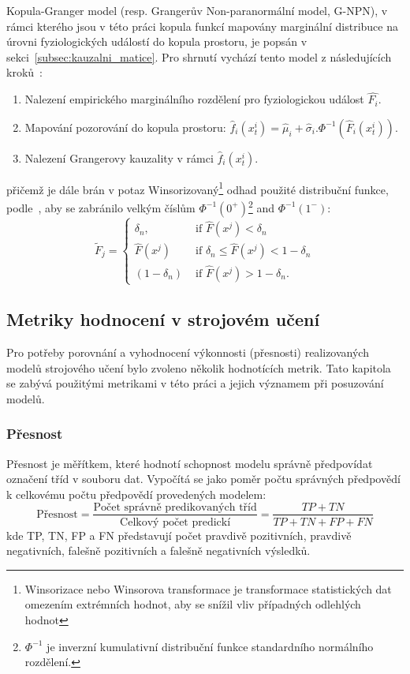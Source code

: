Kopula-Granger model (resp. Grangerův Non-paranormální model, G-NPN), v rámci
kterého jsou v této práci kopula funkcí mapovány marginální distribuce na úrovni
fyziologických událostí do kopula prostoru, je popsán v
sekci~\ref{subsec:kauzalni_matice}. Pro shrnutí vychází tento model z
následujících kroků~\cite{Guy2016}:
\begin{enumerate}
    \item Nalezení empirického marginálního rozdělení pro fyziologickou událost
          $\hat{F_i}$.
    \item Mapování pozorování do kopula prostoru:
          $\hat{f}_i\left(x_t^i\right)=\hat{\mu}_i+\hat{\sigma}_i.
              \Phi^{-1}\left(\hat{F}_i\left(x_t^i\right)\right)$.
    \item Nalezení Grangerovy kauzality v rámci $\hat{f}_i\left(x_t^i\right)$.
\end{enumerate}
přičemž je dále brán v potaz Winsorizovaný\footnote{Winsorizace nebo Winsorova
transformace je transformace statistických dat omezením extrémních hodnot,
aby se snížil vliv případných odlehlých hodnot} odhad použité distribuční
funkce, podle~\cite{Bahadori2013}, aby se zabránilo velkým číslům
$\Phi^{-1}\left(0^{+}\right)$\footnote{$\Phi^{-1}$ je inverzní kumulativní
distribuční funkce standardního normálního rozdělení.} and
$\Phi^{-1}\left(1^{-}\right)$:
\begin{equation}
    \tilde{F}_j= \begin{cases}\delta_n, & \text { if } \hat{F}\left(x^j\right)<\delta_n \\ \hat{F}\left(x^j\right) & \text { if } \delta_n \leq \hat{F}\left(x^j\right)<1-\delta_n \\ \left(1-\delta_n\right) & \text { if } \hat{F}\left(x^j\right)>1-\delta_n .\end{cases}
\end{equation}

\subsection{Metriky hodnocení v strojovém učení}
\label{subsec:ml_metriky}
Pro potřeby porovnání a vyhodnocení výkonnosti (přesnosti) realizovaných modelů
strojového učení bylo zvoleno několik hodnotících metrik. Tato kapitola se
zabývá použitými metrikami v této práci a jejich významem při posuzování modelů.

\subsubsection{Přesnost}
Přesnost je měřítkem, které hodnotí schopnost modelu správně předpovídat
označení tříd v souboru dat. Vypočítá se jako poměr počtu správných předpovědí k
celkovému počtu předpovědí provedených modelem:
\begin{equation}
    \text{Přesnost} = \frac{\text{Počet správně predikovaných tříd}}{\text{Celkový počet predickí}} = \frac{TP + TN}{TP + TN + FP + FN}
\end{equation}
kde TP, TN, FP a FN představují počet pravdivě pozitivních, pravdivě
negativních, falešně pozitivních a falešně negativních výsledků.

